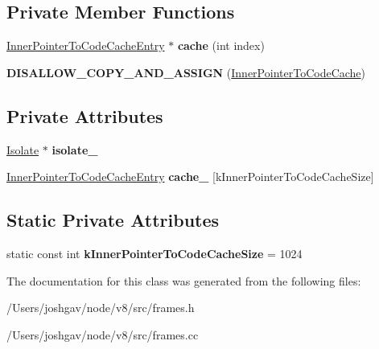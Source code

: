 \subsection*{Private Member Functions}
\begin{DoxyCompactItemize}
\item 
\hyperlink{structv8_1_1internal_1_1_inner_pointer_to_code_cache_1_1_inner_pointer_to_code_cache_entry}{Inner\+Pointer\+To\+Code\+Cache\+Entry} $\ast$ {\bfseries cache} (int index)\hypertarget{classv8_1_1internal_1_1_inner_pointer_to_code_cache_abf571a58ecd0f494fa251a2867143d1d}{}\label{classv8_1_1internal_1_1_inner_pointer_to_code_cache_abf571a58ecd0f494fa251a2867143d1d}

\item 
{\bfseries D\+I\+S\+A\+L\+L\+O\+W\+\_\+\+C\+O\+P\+Y\+\_\+\+A\+N\+D\+\_\+\+A\+S\+S\+I\+GN} (\hyperlink{classv8_1_1internal_1_1_inner_pointer_to_code_cache}{Inner\+Pointer\+To\+Code\+Cache})\hypertarget{classv8_1_1internal_1_1_inner_pointer_to_code_cache_abdee7e5f334076e010ca7ada392e4fc0}{}\label{classv8_1_1internal_1_1_inner_pointer_to_code_cache_abdee7e5f334076e010ca7ada392e4fc0}

\end{DoxyCompactItemize}
\subsection*{Private Attributes}
\begin{DoxyCompactItemize}
\item 
\hyperlink{classv8_1_1internal_1_1_isolate}{Isolate} $\ast$ {\bfseries isolate\+\_\+}\hypertarget{classv8_1_1internal_1_1_inner_pointer_to_code_cache_a3b49fbdfbc0937ec8888c9ab703ca70c}{}\label{classv8_1_1internal_1_1_inner_pointer_to_code_cache_a3b49fbdfbc0937ec8888c9ab703ca70c}

\item 
\hyperlink{structv8_1_1internal_1_1_inner_pointer_to_code_cache_1_1_inner_pointer_to_code_cache_entry}{Inner\+Pointer\+To\+Code\+Cache\+Entry} {\bfseries cache\+\_\+} \mbox{[}k\+Inner\+Pointer\+To\+Code\+Cache\+Size\mbox{]}\hypertarget{classv8_1_1internal_1_1_inner_pointer_to_code_cache_aad9bf910e5055fe770ddce1e6e415abb}{}\label{classv8_1_1internal_1_1_inner_pointer_to_code_cache_aad9bf910e5055fe770ddce1e6e415abb}

\end{DoxyCompactItemize}
\subsection*{Static Private Attributes}
\begin{DoxyCompactItemize}
\item 
static const int {\bfseries k\+Inner\+Pointer\+To\+Code\+Cache\+Size} = 1024\hypertarget{classv8_1_1internal_1_1_inner_pointer_to_code_cache_ae7e9b029a1b22b6ac115ce72b5c3afff}{}\label{classv8_1_1internal_1_1_inner_pointer_to_code_cache_ae7e9b029a1b22b6ac115ce72b5c3afff}

\end{DoxyCompactItemize}


The documentation for this class was generated from the following files\+:\begin{DoxyCompactItemize}
\item 
/\+Users/joshgav/node/v8/src/frames.\+h\item 
/\+Users/joshgav/node/v8/src/frames.\+cc\end{DoxyCompactItemize}
